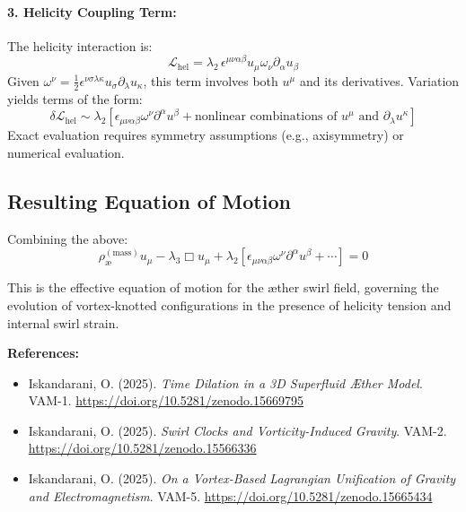 \documentclass[twocolumn,aps,pre,floatfix,nofootinbib]{revtex4-2}
\begin{document}
    \paragraph{3. Helicity Coupling Term:}
    The helicity interaction is:
    \[
        \mathcal{L}_{\text{hel}} = \lambda_2\, \epsilon^{\mu\nu\alpha\beta} u_\mu \omega_\nu \partial_\alpha u_\beta
    \]
    Given \( \omega^\nu = \frac{1}{2} \epsilon^{\nu\sigma\lambda\kappa} u_\sigma \partial_\lambda u_\kappa \), this term involves both \( u^\mu \) and its derivatives. Variation yields terms of the form:
    \[
        \delta \mathcal{L}_{\text{hel}} \sim
        \lambda_2 \left[
                      \epsilon_{\mu\nu\alpha\beta} \omega^\nu \partial^\alpha u^\beta
                      + \text{nonlinear combinations of } u^\mu \text{ and } \partial_\lambda u^\kappa
        \right]
    \]
    Exact evaluation requires symmetry assumptions (e.g., axisymmetry) or numerical evaluation.

    \subsection*{Resulting Equation of Motion}

    Combining the above:
    \begin{equation}
        \boxed{
            \rho_{\text{\ae}}^{(\text{mass})} u_\mu
            - \lambda_3 \Box u_\mu
            + \lambda_2 \left[ \epsilon_{\mu\nu\alpha\beta} \omega^\nu \partial^\alpha u^\beta + \cdots \right]
            = 0
        }
    \end{equation}

    This is the effective equation of motion for the æther swirl field, governing the evolution of vortex-knotted configurations in the presence of helicity tension and internal swirl strain.

    \vspace{1em}
    \noindent
    \textbf{References:}
    \begin{itemize}
        \item Iskandarani, O. (2025). \textit{Time Dilation in a 3D Superfluid Æther Model}. VAM-1. \url{https://doi.org/10.5281/zenodo.15669795}
        \item Iskandarani, O. (2025). \textit{Swirl Clocks and Vorticity-Induced Gravity}. VAM-2. \url{https://doi.org/10.5281/zenodo.15566336}
        \item Iskandarani, O. (2025). \textit{On a Vortex-Based Lagrangian Unification of Gravity and Electromagnetism}. VAM-5. \url{https://doi.org/10.5281/zenodo.15665434}
    \end{itemize}
\end{document}
